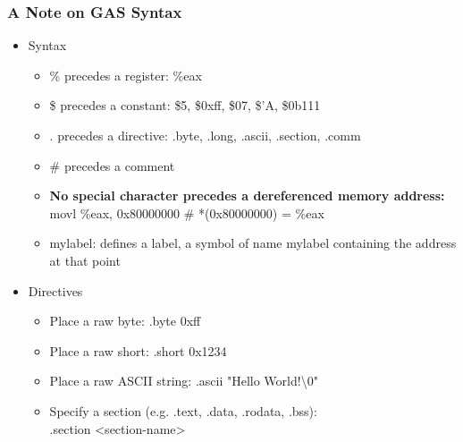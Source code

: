 \documentclass[11pt,xcolor=dvipsnames]{beamer}
\newcommand{\vs}{\vspace{0.5em}}
\begin{document}
\begin{frame}[fragile,t]
\frametitle{A Note on GAS Syntax}
\begin{itemize}
    \item Syntax
    \begin{itemize}
        \item {\ttfamily \%} precedes a register: {\ttfamily \%eax}
        \item {\ttfamily \$} precedes a constant: {\ttfamily \$5, \$0xff, \$07, \$'A, \$0b111}
        \item {\ttfamily .} precedes a directive: {\ttfamily .byte, .long, .ascii, .section, .comm}
	\item {\ttfamily \#} precedes a comment
        \vs
        \pause
        \item {\bf No special character precedes a dereferenced memory address:} \\ {\ttfamily movl \%eax, 0x80000000 \;\; \# *(0x80000000) = \%eax}
        \pause
        \item {\ttfamily mylabel:} defines a label, a symbol of name {\ttfamily mylabel} containing the address at that point
        \pause
    \end{itemize}
    \vs
    \item Directives
    \begin{itemize}
        \item Place a raw byte: {\ttfamily .byte 0xff}
        \item Place a raw short: {\ttfamily .short 0x1234}
        \item Place a raw ASCII string: {\ttfamily .ascii "Hello World!\textbackslash0"}
        \item Specify a section (e.g. .text, .data, .rodata, .bss): \\ {\ttfamily .section <section-name>}
    \end{itemize}
\end{itemize}
\end{frame}
\end{document}
